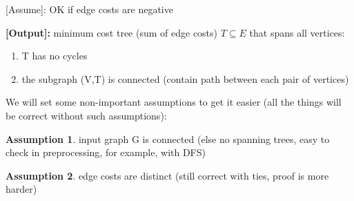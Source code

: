 \documentclass[a4paper,12pt]{article}
\theoremstyle{plain}
\theoremstyle{definition}
\newtheorem{assumption}{Assumption}[subsection]
\theoremstyle{remark}
\begin{document}
[Assume]: OK if edge costs are negative

\textbf{[Output]:} minimum cost tree (sum of edge costs) $T \subseteq E$ that spans all vertices:
\begin{enumerate}
\item T has no cycles
\item the subgraph (V,T) is connected (contain path between each pair of vertices)
\end{enumerate}
We will set some non-important assumptions to get it easier (all the things will be correct without such assumptions):
\begin{assumption}input graph G is connected (else no spanning trees, easy to check in preprocessing, for example, with DFS)\end{assumption}
\begin{assumption}edge costs are distinct (still correct with ties, proof is more harder)\end{assumption}
\end{document}
